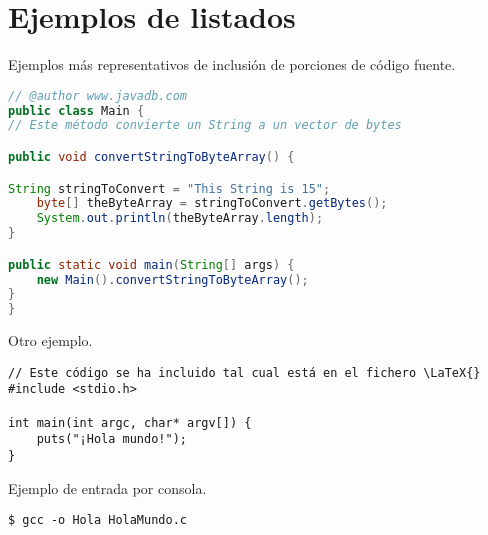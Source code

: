 \section{Ejemplos de listados}
\label{sec:ejListados}

Ejemplos más representativos de inclusión de porciones de código 
fuente.

\begin{lstlisting}[language=Java,float=ht,caption={[Código fuente en Java]Ejemplo de código fuente en lenguaje Java},label=lst:java]
// @author www.javadb.com
public class Main {    
// Este método convierte un String a un vector de bytes

public void convertStringToByteArray() {

String stringToConvert = "This String is 15";      
	byte[] theByteArray = stringToConvert.getBytes();        
	System.out.println(theByteArray.length);        
}

public static void main(String[] args) {
	new Main().convertStringToByteArray();
}
}
\end{lstlisting}



\noindent Otro ejemplo.

\begin{lstlisting}[style=C-ruled,float=ht,caption={Ejemplo de código C},label=lst:codC]
// Este código se ha incluido tal cual está en el fichero \LaTeX{}
#include <stdio.h>

int main(int argc, char* argv[]) {
	puts("¡Hola mundo!");
}
\end{lstlisting}


\noindent Ejemplo de entrada por consola.

\begin{lstlisting}[style=consola, numbers=none]
$ gcc -o Hola HolaMundo.c
\end{lstlisting}



